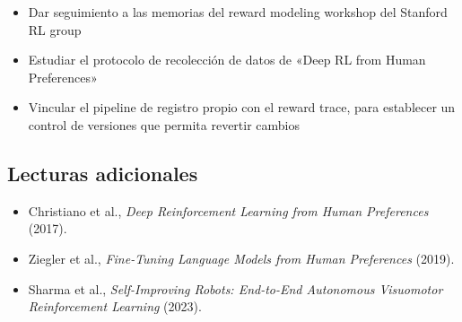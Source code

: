 \documentclass[a4paper]{article}
\begin{document}
\begin{itemize}
    \item Dar seguimiento a las memorias del reward modeling workshop del Stanford RL group
    \item Estudiar el protocolo de recolección de datos de «Deep RL from Human Preferences»
    \item Vincular el pipeline de registro propio con el reward trace, para establecer un control de versiones que permita revertir cambios
\end{itemize}

\subsection{Lecturas adicionales}
\begin{itemize}
    \item Christiano et al., \textit{Deep Reinforcement Learning from Human Preferences} (2017).
    \item Ziegler et al., \textit{Fine-Tuning Language Models from Human Preferences} (2019).
    \item Sharma et al., \textit{Self-Improving Robots: End-to-End Autonomous Visuomotor Reinforcement Learning} (2023).
\end{itemize}
\end{document}
